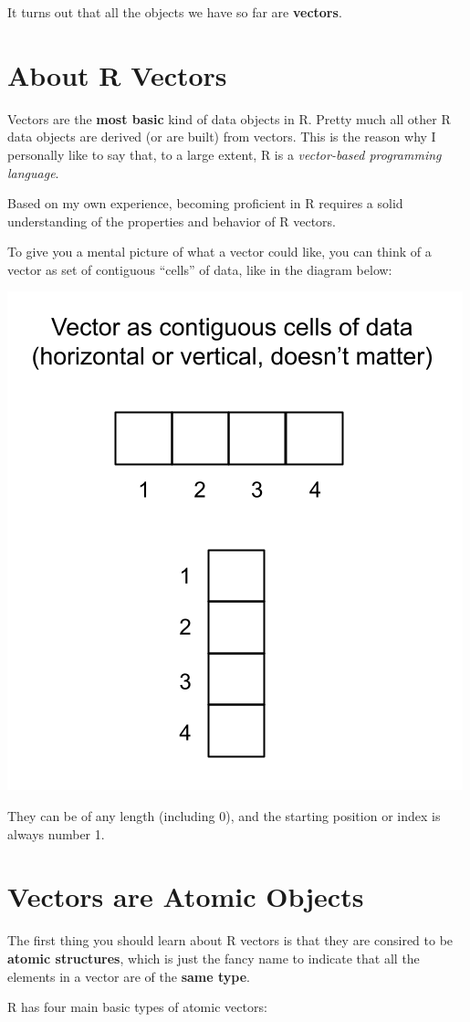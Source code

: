 \documentclass[
]{book}
\begin{document}
It turns out that all the objects we have so far are \textbf{vectors}.

\hypertarget{about-r-vectors}{%
\section{About R Vectors}\label{about-r-vectors}}

Vectors are the \textbf{most basic} kind of data objects in R. Pretty much all other
R data objects are derived (or are built) from vectors. This is the reason why
I personally like to say that, to a large extent, R is a
\emph{vector-based programming language}.

Based on my own experience, becoming proficient in R requires a solid
understanding of the properties and behavior of R vectors.

To give you a mental picture of what a vector could like, you can think of a
vector as set of contiguous ``cells'' of data, like in the diagram below:

\begin{center}\includegraphics[width=0.4\linewidth]{images/objects/obj-vectors} \end{center}

They can be of any length (including 0), and the starting position or index is
always number 1.

\hypertarget{vectors-are-atomic-objects}{%
\section{Vectors are Atomic Objects}\label{vectors-are-atomic-objects}}

The first thing you should learn about R vectors is that they are consired to
be \textbf{atomic structures}, which is just the fancy name to indicate that all the
elements in a vector are of the \textbf{same type}.

R has four main basic types of atomic vectors:
\end{document}
